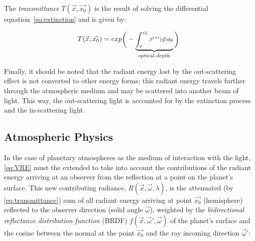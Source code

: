 \documentclass[journal]{vgtc}                %
\newcommand{\review}[1]{{\color{blue}#1}}
\begin{document}
\review{The \textit{transmittance} $T(\vec{x}, \vec{x_0})$} is the result of solving the differential equation~\ref{eq:extinction} and is given by:

\vspace*{-2.5mm}
\begin{equation}\label{eq:transmittance}
\small
T(\vec{x}, \vec{x_0}) = exp\Bigg(-\underbrace{\int_{\vec{x}}^{\vec{x_0}}{\beta^{ext}(\vec{y})dy}}_{\text{optical depth}}\Bigg)
\end{equation} 
\vspace*{-1.5mm}

Finally, \review{it should be noted that} the radiant energy lost by the out-scattering effect is not converted to other energy forms; this radiant energy travels further through the \review{atmospheric} medium and may be scattered into another beam of light. This way, the out-scattering light is accounted for by the extinction process and the in-scattering light.


\subsection{Atmospheric Physics}\label{sec:atmPhysics}

 
In the case of planetary atmospheres as the medium of interaction with the light, \autoref{eq:VRE} must the extended to take into account the contributions of the radiant energy arriving at an observer from the reflection at a point on the planet's surface. This new contributing radiance, $R(\vec{x}, \vec{\omega}, \lambda)$, is the attenuated (by \autoref{eq:transmittance}) sum of all radiant energy arriving at point $\vec{x_0}$ (hemisphere) reflected to the observer direction (solid angle $\vec{\omega}$), weighted by the \textit{bidirectional reflectance distribution function} (BRDF) $f(\vec{x}, \vec{\omega}', \vec{\omega})$ of the planet's surface and the cosine between the normal at the point $\vec{x_0}$ and the ray incoming direction $\vec{\omega}'$:
\end{document}
